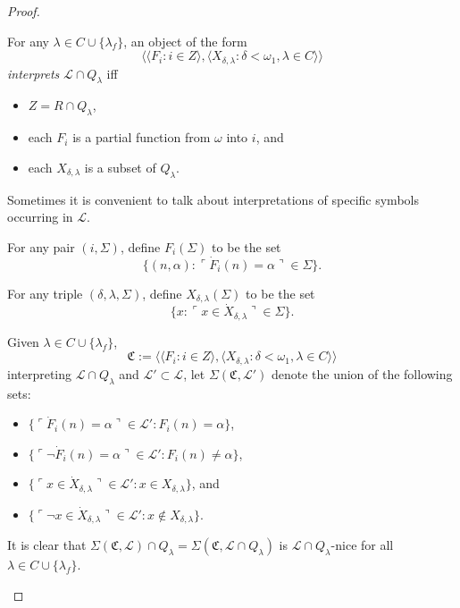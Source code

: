 \documentclass[12pt]{article}
\numberwithin{equation}{section}
\begin{document}
\begin{proof}
\begin{defi}\label{def412}
For any $\lambda \in C \cup \{\lambda_f\}$, an object of the form $$\langle \langle F_i : i \in Z \rangle, \langle X_{\delta, \lambda} : \delta < \omega_1, \lambda \in C \rangle \rangle$$ \emph{interprets} $\mathcal{L} \cap Q_{\lambda}$ iff 
\begin{itemize}
    \item $Z = R \cap Q_{\lambda}$,
    \item each $F_i$ is a partial function from $\omega$ into $i$, and 
    \item each $X_{\delta, \lambda}$ is a subset of $Q_{\lambda}$. 
\end{itemize}
\end{defi}

Sometimes it is convenient to talk about interpretations of specific symbols occurring in $\mathcal{L}$.

\begin{defi}
For any pair $(i, \Sigma)$, define $F_i(\Sigma)$ to be the set $$\{(n, \alpha) : \ulcorner \dot{F}_i(n) = \alpha \urcorner \in \Sigma\}.$$
\end{defi}

\begin{defi}
For any triple $(\delta, \lambda, \Sigma)$, define $X_{\delta, \lambda}(\Sigma)$ to be the set $$\{x : \ulcorner x \in \dot{X}_{\delta, \lambda} \urcorner \in \Sigma\}.$$
\end{defi}

\begin{defi}\label{def415}
Given $\lambda \in C \cup \{\lambda_f\}$, $$\mathfrak{C} := \langle \langle F_i : i \in Z \rangle, \langle X_{\delta, \lambda} : \delta < \omega_1, \lambda \in C \rangle \rangle$$
interpreting $\mathcal{L} \cap Q_{\lambda}$ and $\mathcal{L}' \subset \mathcal{L}$, let $\Sigma(\mathfrak{C}, \mathcal{L}')$ denote the union of the following sets:
\begin{itemize}
    \item $\{\ulcorner \dot{F}_i (n) = \alpha \urcorner \in \mathcal{L}' : F_i (n) = \alpha\}$,
    \item $\{\ulcorner \neg \dot{F}_i (n) = \alpha \urcorner \in \mathcal{L}' : F_i (n) \neq \alpha\}$,
    \item $\{\ulcorner x \in \dot{X}_{\delta, \lambda} \urcorner \in \mathcal{L}' : x \in X_{\delta, \lambda}\}$, and
    \item $\{\ulcorner \neg x \in \dot{X}_{\delta, \lambda} \urcorner \in \mathcal{L}' : x \not\in X_{\delta, \lambda}\}$.
\end{itemize}
It is clear that $\Sigma(\mathfrak{C}, \mathcal{L}) \cap Q_{\lambda} = \Sigma(\mathfrak{C}, \mathcal{L} \cap Q_{\lambda})$ is $\mathcal{L} \cap Q_{\lambda}$-nice for all $\lambda \in C \cup \{\lambda_f\}$.
\end{defi}


\end{proof}
\end{document}
